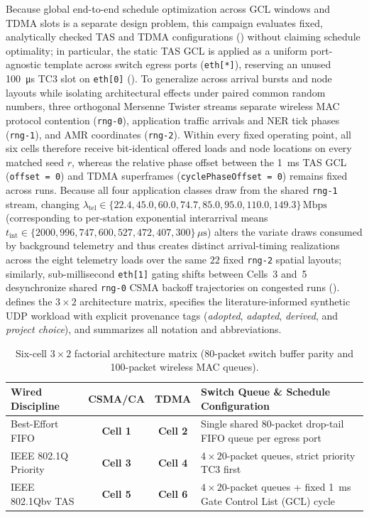 \documentclass[11pt,a4paper]{article}
\newcommand{\ltel}{\ensuremath{\lambda_{\mathrm{tel}}}}
\begin{document}
Because global end-to-end schedule optimization across GCL windows and TDMA slots is a separate design problem, this campaign evaluates fixed, analytically checked TAS and TDMA configurations () without claiming schedule optimality; in particular, the static TAS GCL is applied as a uniform port-agnostic template across switch egress ports (\texttt{eth[*]}), reserving an unused \qty{100}{\micro\second} TC3 slot on \texttt{eth[0]} (). To generalize across arrival bursts and node layouts while isolating architectural effects under paired common random numbers, three orthogonal Mersenne Twister streams separate wireless MAC protocol contention (\texttt{rng-0}), application traffic arrivals and NER tick phases (\texttt{rng-1}), and AMR coordinates (\texttt{rng-2}). Within every fixed operating point, all six cells therefore receive bit-identical offered loads and node locations on every matched seed $r$, whereas the relative phase offset between the \qty{1}{\milli\second} TAS GCL (\texttt{offset = 0}) and TDMA superframes (\texttt{cyclePhaseOffset = 0}) remains fixed across runs. Because all four application classes draw from the shared \texttt{rng-1} stream, changing $\ltel \in \{22.4, 45.0, 60.0, 74.7, 85.0, 95.0, 110.0, 149.3\}\,\text{Mbps}$ (corresponding to per-station exponential interarrival means $t_{\mathrm{int}} \in \{2000, 996, 747, 600, 527, 472, 407, 300\}\,\mu\text{s}$) alters the variate draws consumed by background telemetry and thus creates distinct arrival-timing realizations across the eight telemetry loads over the same $22$ fixed \texttt{rng-2} spatial layouts; similarly, sub-millisecond \texttt{eth[1]} gating shifts between Cells~3 and~5 desynchronize shared \texttt{rng-0} CSMA backoff trajectories on congested runs ().  defines the $3 \times 2$ architecture matrix,  specifies the literature-informed synthetic UDP workload with explicit provenance tags (\emph{adopted}, \emph{adapted}, \emph{derived}, and \emph{project choice}), and  summarizes all notation and abbreviations.

\begin{table}[!tb]
\centering
\footnotesize
\setlength{\tabcolsep}{3.0pt}
\caption{Six-cell $3 \times 2$ factorial architecture matrix (80-packet switch buffer parity and 100-packet wireless MAC queues).}
\label{tab:six_cell_matrix}
\begin{tabularx}{\textwidth}{@{}l c c Y@{}}
\toprule
\textbf{Wired Discipline} & \textbf{CSMA/CA} & \textbf{TDMA} & \textbf{Switch Queue \& Schedule Configuration} \\
\midrule
Best-Effort FIFO & \textbf{Cell 1} & \textbf{Cell 2} & Single shared 80-packet drop-tail FIFO queue per egress port \\
IEEE 802.1Q Priority & \textbf{Cell 3} & \textbf{Cell 4} & $4 \times 20$-packet queues, strict priority TC3 first \\
IEEE 802.1Qbv TAS & \textbf{Cell 5} & \textbf{Cell 6} & $4 \times 20$-packet queues + fixed \qty{1}{\milli\second} Gate Control List (GCL) cycle \\
\bottomrule
\end{tabularx}
\end{table}
\end{document}
